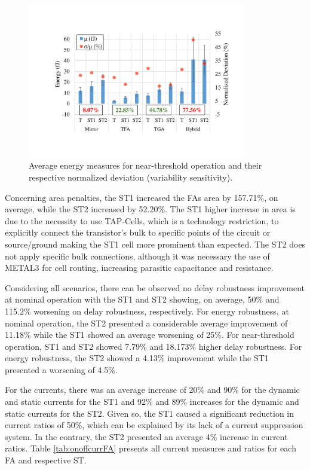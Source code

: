 \documentclass[diss,pgmicro,english]{iiufrgs}
\begin{document}
\begin{figure}[h]
  \centering
    \includegraphics[width=0.85\textwidth, trim={3.5cm 3cm 2cm 3.5cm}, clip]{averageEnergyNT.pdf}
     \caption{Average energy measures for near-threshold operation and their respective normalized deviation (variability sensitivity).}
  \label{fig:avgEnergyNT}
\end{figure}

Concerning area penalties, the ST1 increased the FAs area by 157.71\%, on average, while the ST2 increased by 52.20\%. The ST1 higher increase in area is due to the necessity to use TAP-Cells, which is a technology restriction, to explicitly connect the transistor's bulk to specific points of the circuit or source/ground making the ST1 cell more prominent than expected. The ST2 does not apply specific bulk connections, although it was necessary the use of METAL3 for cell routing, increasing parasitic capacitance and resistance.

Considering all scenarios, there can be observed no delay robustness improvement at nominal operation with the ST1 and ST2 showing, on average, 50\% and 115.2\% worsening on delay robustness, respectively. For energy robustness, at nominal operation, the ST2 presented a considerable average improvement of 11.18\% while the ST1 showed an average worsening of 25\%. For near-threshold operation, ST1 and ST2 showed 7.79\% and 18.173\% higher delay robustness. For energy robustness, the ST2 showed a 4.13\% improvement while the ST1 presented a worsening of 4.5\%.


For the currents, there was an average increase of 20\% and 90\% for the dynamic and static currents for the ST1 and 92\% and 89\% increases for the dynamic and static currents for the ST2. Given so, the ST1 caused a significant reduction in current ratios of 50\%, which can be explained by its lack of a current suppression system. In the contrary, the ST2 presented an average 4\% increase in current ratios. Table \ref{tab:onoffcurrFA} presents all current measures and ratios for each FA and respective ST.
\end{document}
